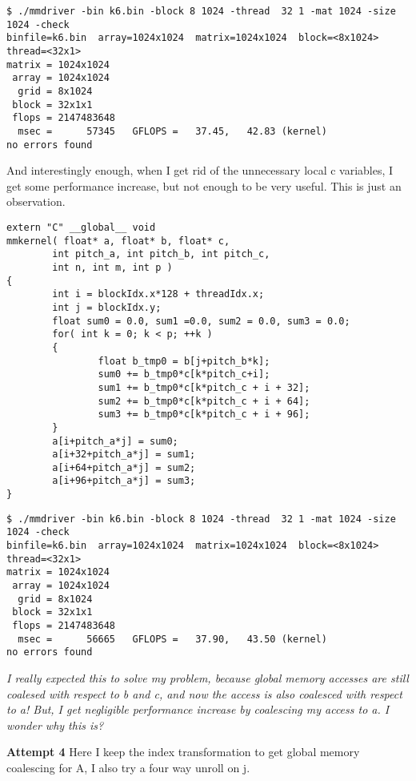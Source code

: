 \documentclass[11pt]{article}
\begin{document}
\begin{enumerate}
\begin{lstlisting}
\end{lstlisting}

\begin{lstlisting}
$ ./mmdriver -bin k6.bin -block 8 1024 -thread  32 1 -mat 1024 -size 1024 -check
binfile=k6.bin  array=1024x1024  matrix=1024x1024  block=<8x1024>  thread=<32x1>
matrix = 1024x1024
 array = 1024x1024
  grid = 8x1024
 block = 32x1x1
 flops = 2147483648
  msec =      57345   GFLOPS =   37.45,   42.83 (kernel)
no errors found
\end{lstlisting}

And interestingly enough, when I get rid of the unnecessary local c variables, I get some performance increase, but not enough to be very useful. This is just an observation.

\begin{lstlisting}
extern "C" __global__ void
mmkernel( float* a, float* b, float* c,
        int pitch_a, int pitch_b, int pitch_c,
        int n, int m, int p )
{
        int i = blockIdx.x*128 + threadIdx.x;
        int j = blockIdx.y;
        float sum0 = 0.0, sum1 =0.0, sum2 = 0.0, sum3 = 0.0;
        for( int k = 0; k < p; ++k )
        {
                float b_tmp0 = b[j+pitch_b*k];
                sum0 += b_tmp0*c[k*pitch_c+i];
                sum1 += b_tmp0*c[k*pitch_c + i + 32];
                sum2 += b_tmp0*c[k*pitch_c + i + 64];
                sum3 += b_tmp0*c[k*pitch_c + i + 96];
        }
        a[i+pitch_a*j] = sum0;
        a[i+32+pitch_a*j] = sum1;
        a[i+64+pitch_a*j] = sum2;
        a[i+96+pitch_a*j] = sum3;
}
\end{lstlisting}

\begin{lstlisting}
$ ./mmdriver -bin k6.bin -block 8 1024 -thread  32 1 -mat 1024 -size 1024 -check
binfile=k6.bin  array=1024x1024  matrix=1024x1024  block=<8x1024>  thread=<32x1>
matrix = 1024x1024
 array = 1024x1024
  grid = 8x1024
 block = 32x1x1
 flops = 2147483648
  msec =      56665   GFLOPS =   37.90,   43.50 (kernel)
no errors found
\end{lstlisting}

\emph{I really expected this to solve my problem, because global memory accesses are still coalesed with respect to b and c, and now the access is also coalesced with respect to a! But, I get negligible performance increase by coalescing my access to a. I wonder why this is?}

\textbf{Attempt 4} Here I keep the index transformation to get global memory coalescing for A, I also try a four way unroll on j.


\end{enumerate}
\end{document}
